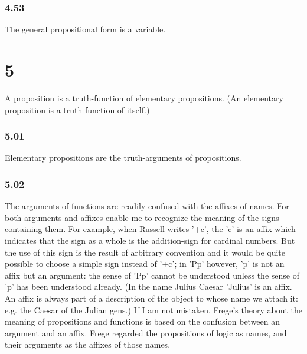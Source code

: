 \documentclass[11pt]{article}
\begin{document}
\subsubsection*{4.53}
\label{sec:org4273229}
The general propositional form is a variable.
\section*{5}
\label{sec:org7a2ad09}
A proposition is a truth-function of elementary propositions. (An
elementary proposition is a truth-function of itself.)
\subsubsection*{5.01}
\label{sec:org25a1bd4}
Elementary propositions are the truth-arguments of propositions.
\subsubsection*{5.02}
\label{sec:org42863b1}
The arguments of functions are readily confused with the affixes of
names. For both arguments and affixes enable me to recognize the meaning of
the signs containing them. For example, when Russell writes '+c', the 'c'
is an affix which indicates that the sign as a whole is the addition-sign
for cardinal numbers. But the use of this sign is the result of arbitrary
convention and it would be quite possible to choose a simple sign instead
of '+c'; in 'Pp' however, 'p' is not an affix but an argument: the sense of
'Pp' cannot be understood unless the sense of 'p' has been understood
already. (In the name Julius Caesar 'Julius' is an affix. An affix is
always part of a description of the object to whose name we attach it: e.g.
the Caesar of the Julian gens.) If I am not mistaken, Frege's theory about
the meaning of propositions and functions is based on the confusion between
an argument and an affix. Frege regarded the propositions of logic as
names, and their arguments as the affixes of those names.
\end{document}
